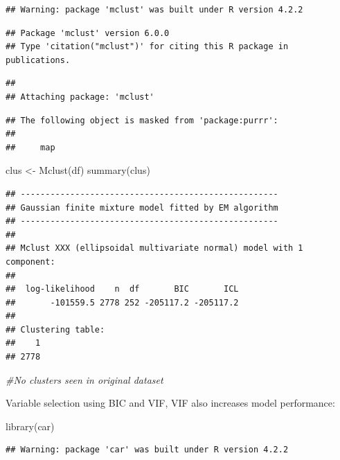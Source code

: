 \documentclass[
]{article}
\newenvironment{Shaded}{\begin{snugshade}}{\end{snugshade}}
\newcommand{\CommentTok}[1]{\textcolor[rgb]{0.56,0.35,0.01}{\textit{#1}}}
\newcommand{\FunctionTok}[1]{\textcolor[rgb]{0.00,0.00,0.00}{#1}}
\newcommand{\NormalTok}[1]{#1}
\newcommand{\OtherTok}[1]{\textcolor[rgb]{0.56,0.35,0.01}{#1}}
\begin{document}
\begin{verbatim}
## Warning: package 'mclust' was built under R version 4.2.2
\end{verbatim}

\begin{verbatim}
## Package 'mclust' version 6.0.0
## Type 'citation("mclust")' for citing this R package in publications.
\end{verbatim}

\begin{verbatim}
## 
## Attaching package: 'mclust'
\end{verbatim}

\begin{verbatim}
## The following object is masked from 'package:purrr':
## 
##     map
\end{verbatim}

\begin{Shaded}
\begin{Highlighting}[]
\NormalTok{clus }\OtherTok{\textless{}{-}} \FunctionTok{Mclust}\NormalTok{(df)}
\FunctionTok{summary}\NormalTok{(clus)}
\end{Highlighting}
\end{Shaded}

\begin{verbatim}
## ---------------------------------------------------- 
## Gaussian finite mixture model fitted by EM algorithm 
## ---------------------------------------------------- 
## 
## Mclust XXX (ellipsoidal multivariate normal) model with 1 component: 
## 
##  log-likelihood    n  df       BIC       ICL
##       -101559.5 2778 252 -205117.2 -205117.2
## 
## Clustering table:
##    1 
## 2778
\end{verbatim}

\begin{Shaded}
\begin{Highlighting}[]
\CommentTok{\#No clusters seen in original dataset}
\end{Highlighting}
\end{Shaded}

Variable selection using BIC and VIF, VIF also increases model
performance:

\begin{Shaded}
\begin{Highlighting}[]
\FunctionTok{library}\NormalTok{(car)}
\end{Highlighting}
\end{Shaded}

\begin{verbatim}
## Warning: package 'car' was built under R version 4.2.2
\end{verbatim}
\end{document}
